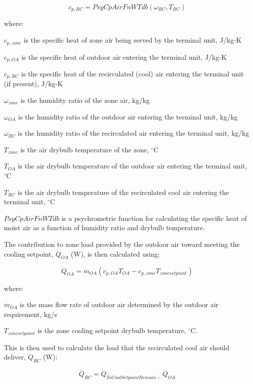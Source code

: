 \begin{equation}
{c_{p,RC}} = PsyCpAirFnWTdb\left( {{\omega_{RC}},{T_{RC}}} \right)
\end{equation}

where:

\(c_{p,zone}\) is the specific heat of zone air being served by the terminal unit, J/kg-K

\(c_{p,OA}\) is the specific heat of outdoor air entering the terminal unit, J/kg-K

\(c_{p,RC}\) is the specific heat of the recirculated (cool) air entering the terminal unit (if present), J/kg-K

\(\omega_{zone}\) is the humidity ratio of the zone air, kg/kg

\(\omega_{OA}\) is the humidity ratio of the outdoor air entering the terminal unit, kg/kg

\(\omega_{RC}\) is the humidity ratio of the recirculated air entering the terminal unit, kg/kg

\(T_{zone}\) is the air drybulb temperature of the zone, \(^{\circ}\)C

\(T_{OA}\) is the air drybulb temperature of the outdoor air entering the terminal unit, \(^{\circ}\)C

\(T_{RC}\) is the air drybulb temperature of the recirculated cool air entering the terminal unit, \(^{\circ}\)C

\(PsyCpAirFnWTdb\) is a psychrometric function for calculating the specific heat of moist air as a function of humidity ratio and drybulb temperature.

The contribution to zone load provided by the outdoor air toward meeting the cooling setpoint, \({\dot Q_{OA}}\) (W), is then calculated using:

\begin{equation}
{\dot Q_{OA}} = {\dot m_{OA}}\left( {{c_{p,OA}}{T_{OA}} - {c_{p,zone}}{T_{zonesetpoint}}} \right)
\end{equation}

where:

\(\dot{m}_{OA}\) is the mass flow rate of outdoor air determined by the outdoor air requirement, kg/s

\(T_{zonesetpoint}\) is the zone cooling setpoint drybulb temperature, \(^{\circ}\)C.

This is then used to calculate the load that the recirculated cool air should deliver, \({Q_{RC}}\) (W):

\begin{equation}
{\dot Q_{RC}} = {\dot Q_{ToCoolSetpointRemain - }}{\dot Q_{OA}}
\end{equation}

